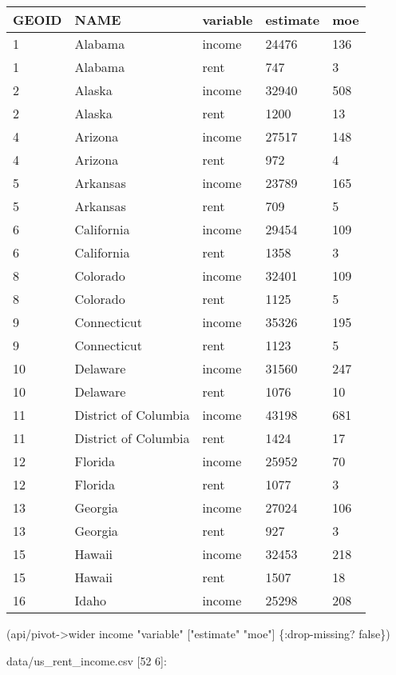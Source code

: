 \documentclass[]{article}
\newenvironment{Shaded}{\begin{snugshade}}{\end{snugshade}}
\newcommand{\AttributeTok}[1]{\textcolor[rgb]{0.77,0.63,0.00}{#1}}
\newcommand{\NormalTok}[1]{#1}
\newcommand{\StringTok}[1]{\textcolor[rgb]{0.31,0.60,0.02}{#1}}
\newcommand{\VariableTok}[1]{\textcolor[rgb]{0.00,0.00,0.00}{#1}}
\begin{document}
\begin{longtable}[]{@{}lllll@{}}
\toprule
GEOID & NAME & variable & estimate & moe\tabularnewline
\midrule
\endhead
1 & Alabama & income & 24476 & 136\tabularnewline
1 & Alabama & rent & 747 & 3\tabularnewline
2 & Alaska & income & 32940 & 508\tabularnewline
2 & Alaska & rent & 1200 & 13\tabularnewline
4 & Arizona & income & 27517 & 148\tabularnewline
4 & Arizona & rent & 972 & 4\tabularnewline
5 & Arkansas & income & 23789 & 165\tabularnewline
5 & Arkansas & rent & 709 & 5\tabularnewline
6 & California & income & 29454 & 109\tabularnewline
6 & California & rent & 1358 & 3\tabularnewline
8 & Colorado & income & 32401 & 109\tabularnewline
8 & Colorado & rent & 1125 & 5\tabularnewline
9 & Connecticut & income & 35326 & 195\tabularnewline
9 & Connecticut & rent & 1123 & 5\tabularnewline
10 & Delaware & income & 31560 & 247\tabularnewline
10 & Delaware & rent & 1076 & 10\tabularnewline
11 & District of Columbia & income & 43198 & 681\tabularnewline
11 & District of Columbia & rent & 1424 & 17\tabularnewline
12 & Florida & income & 25952 & 70\tabularnewline
12 & Florida & rent & 1077 & 3\tabularnewline
13 & Georgia & income & 27024 & 106\tabularnewline
13 & Georgia & rent & 927 & 3\tabularnewline
15 & Hawaii & income & 32453 & 218\tabularnewline
15 & Hawaii & rent & 1507 & 18\tabularnewline
16 & Idaho & income & 25298 & 208\tabularnewline
\bottomrule
\end{longtable}

\begin{Shaded}
\begin{Highlighting}[]
\NormalTok{(api/pivot->wider income }\StringTok{"variable"}\NormalTok{ [}\StringTok{"estimate"} \StringTok{"moe"}\NormalTok{] \{}\AttributeTok{:drop-missing}\NormalTok{? }\VariableTok{false}\NormalTok{\})}
\end{Highlighting}
\end{Shaded}

data/us\_rent\_income.csv {[}52 6{]}:
\end{document}
